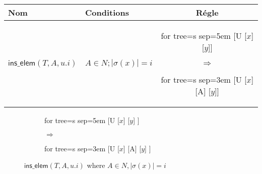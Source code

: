 \begin{table}
	\begin{tabular}{|l|l|c|}
		\hline
		\textbf{Nom} & \textbf{Conditions} & \textbf{Régle} \\
		\hline
		\hline
		$\textsf{ins\_elem}(T, A, u.i)$ & $A \in N; |\sigma(x)| = i$ & \begin{forest}for tree={s sep=5em} [U [$x$] [$y$]]\end{forest} \quad \Large{$\Rightarrow$} \quad \begin{forest} for tree={s sep=3em} [U [$x$] [A] [$y$]] \end{forest} \\
		\hline
	\end{tabular}
\end{table}


\begin{figure}[H]
	\centering
	\begin{subfigure}{0.4\textwidth}
		\centering
		\begin{adjustbox}{valign=c, max width=\textwidth}
			\begin{forest}
			for tree={s sep=5em}
			[U
				[$x$]
				[$y$]
			]
			\end{forest}
		\end{adjustbox}
		\caption{}
	\end{subfigure}
	\begin{subfigure}{0.1\textwidth}
		\centering
		\huge{$\Rightarrow$}
	\end{subfigure}
	\begin{subfigure}{0.4\textwidth}
		\centering
		\begin{adjustbox}{valign=c, max width=\textwidth}
			\begin{forest}
			for tree={s sep=3em}
			[U
				[$x$]
				[A]
				[$y$]
			]
			\end{forest}
		\end{adjustbox}
		\caption{}
	\end{subfigure}
	\caption{$\textsf{ins\_elem}(T, A, u.i)$ where $A \in N, |\sigma(x)| = i$}
	\label{fig:sch:op:insElem}
\end{figure}


